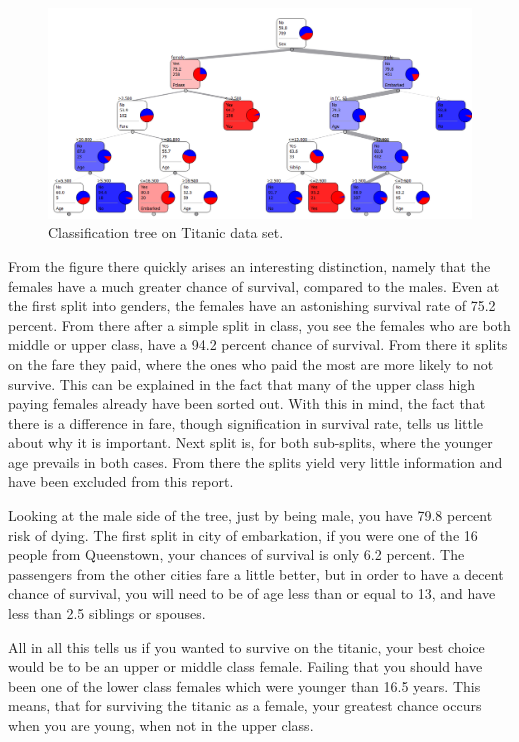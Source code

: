 \documentclass[a4paper,11pt]{article}
\begin{document}
\begin{figure}[h]
\begin{center}
\includegraphics[scale=0.5]{ClassificationTree}
\end{center}
\caption{Classification tree on Titanic data set.}
\label{classificationTree}
\end{figure}

From the figure there quickly arises an interesting distinction, namely that the females have a much greater chance of survival, compared to the males. Even at the first split into genders, the females have an astonishing survival rate of 75.2 percent. From there after a simple split in class, you see the females who are both middle or upper class, have a 94.2 percent chance of survival. From there it splits on the fare they paid, where the ones who paid the most are more likely to not survive. This can be explained in the fact that many of the upper class high paying females already have been sorted out. With this in mind, the fact that there is a difference in fare, though signification in survival rate, tells us little about why it is important. Next split is, for both sub-splits, where the younger age prevails in both cases. From there the splits yield very little information and have been excluded from this report.

Looking at the male side of the tree, just by being male, you have 79.8 percent risk of dying. The first split in city of embarkation, if you were one of the 16 people from Queenstown, your chances of survival is only 6.2 percent. The passengers from the other cities fare a little better, but in order to have a decent chance of survival, you will need to be of age less than or equal to 13, and have less than 2.5 siblings or spouses.

All in all this tells us if you wanted to survive on the titanic, your best choice would be to be an upper or middle class female. Failing that you should have been one of the lower class females which were younger than 16.5 years. This means, that for surviving the titanic as a female, your greatest chance occurs when you are young, when not in the upper class. 
\end{document}
